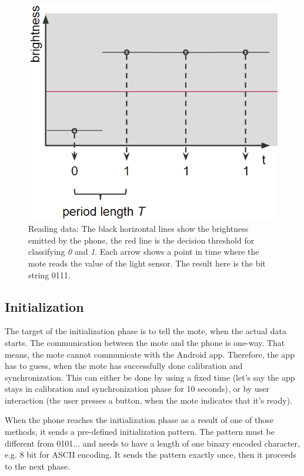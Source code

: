 \documentclass{sig-alternate} %
\begin{document}
\begin{figure}
	\centering
	\includegraphics[scale=.5]{images/reading_data.png}
	\caption{Reading data: The black horizontal lines show the brightness emitted by the phone, the red line is the decision threshold for classifying \textit{0} and \textit{1}. Each arrow shows a point in time where the mote reads the value of the light sensor. The result here is the bit string 0111.}
	\label{fig:read_a_bit}
\end{figure}

\subsection{Initialization}
\label{sub:initialization}

The target of the initialization phase is to tell the mote, when the actual data starts.
The communication between the mote and the phone is one-way.
That means, the mote cannot communicate with the Android app.
Therefore, the app has to guess, when the mote has successfully done calibration and synchronization.
This can either be done by using a fixed time (let's say the app stays in calibration and synchronization phase for 10 seconds), or by user interaction (the user presses a button, when the mote indicates that it's ready).

When the phone reaches the initialization phase as a result of one of those methods, it sends a pre-defined initialization pattern.
The pattern must be different from 0101... and needs to have a length of one binary encoded character, e.g. 8 bit for ASCII encoding.
It sends the pattern exactly once, then it proceeds to the next phase.
\end{document}
